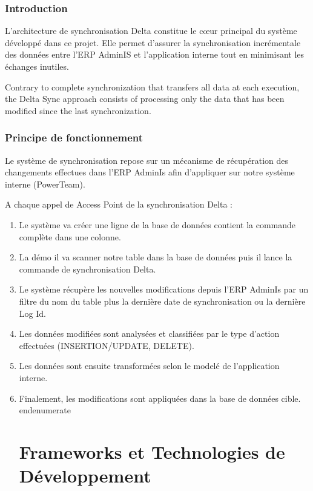 \begin{enumerate}
\begin{itemize}
\begin{itemize}
\begin{itemize}
\begin{itemize}
\subsubsection{Introduction}

L'architecture de synchronisation Delta constitue le cœur principal du système développé dans ce projet. Elle permet d'assurer la synchronisation incrémentale des données entre l'ERP AdminIS et l'application interne tout en minimisant les échanges inutiles.

Contrary to complete synchronization that transfers all data at each execution, the Delta Sync approach consists of processing only the data that has been modified since the last synchronization.

\subsubsection{Principe de fonctionnement}

Le système de synchronisation repose sur un mécanisme de récupération des changements effectues dans l'ERP AdminIs afin d'appliquer sur notre système interne (PowerTeam).

A chaque appel de Access Point de la synchronisation Delta :

\begin{enumerate}
    \item Le système va créer une ligne de la base de données contient la commande complète dans une colonne.
    \item La démo il va scanner notre table dans la base de données puis il lance la commande de synchronisation Delta.
    \item Le système récupère les nouvelles modifications depuis l'ERP AdminIs par un filtre du nom du table plus la dernière date de synchronisation ou la dernière Log Id.
    \item Les données modifiées sont analysées et classifiées par le type d'action effectuées (INSERTION/UPDATE, DELETE).
    \item Les données sont ensuite transformées selon le modelé de l'application interne.
    \item Finalement, les modifications sont appliquées dans la base de données cible.
end{enumerate}

\section{Frameworks et Technologies de Développement}


\end{enumerate}
\end{itemize}
\end{itemize}
\end{itemize}
\end{itemize}
\end{enumerate}
